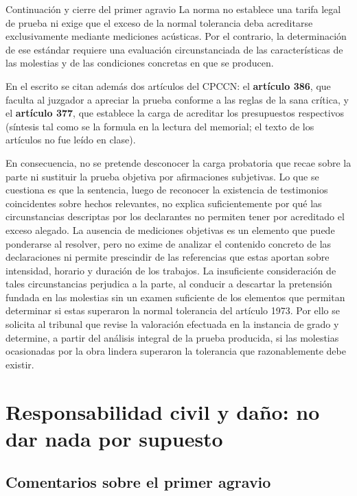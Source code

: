 \documentclass[12pt,oneside]{book}
\begin{document}
\begin{example}{Continuación y cierre del primer agravio}
La norma no establece una tarifa legal de prueba ni exige que el exceso de la normal tolerancia deba acreditarse exclusivamente mediante mediciones acústicas. Por el contrario, la determinación de ese estándar requiere una evaluación circunstanciada de las características de las molestias y de las condiciones concretas en que se producen.

En el escrito se citan además dos artículos del CPCCN: el \textbf{artículo 386}, que faculta al juzgador a apreciar la prueba conforme a las reglas de la sana crítica, y el \textbf{artículo 377}, que establece la carga de acreditar los presupuestos respectivos (síntesis tal como se la formula en la lectura del memorial; el texto de los artículos no fue leído en clase).

En consecuencia, no se pretende desconocer la carga probatoria que recae sobre la parte ni sustituir la prueba objetiva por afirmaciones subjetivas. Lo que se cuestiona es que la sentencia, luego de reconocer la existencia de testimonios coincidentes sobre hechos relevantes, no explica suficientemente por qué las circunstancias descriptas por los declarantes no permiten tener por acreditado el exceso alegado. La ausencia de mediciones objetivas es un elemento que puede ponderarse al resolver, pero no exime de analizar el contenido concreto de las declaraciones ni permite prescindir de las referencias que estas aportan sobre intensidad, horario y duración de los trabajos. La insuficiente consideración de tales circunstancias perjudica a la parte, al conducir a descartar la pretensión fundada en las molestias sin un examen suficiente de los elementos que permitan determinar si estas superaron la normal tolerancia del artículo 1973. Por ello se solicita al tribunal que revise la valoración efectuada en la instancia de grado y determine, a partir del análisis integral de la prueba producida, si las molestias ocasionadas por la obra lindera superaron la tolerancia que razonablemente debe existir.
\end{example}

\section{Responsabilidad civil y daño: no dar nada por supuesto}

\subsection{Comentarios sobre el primer agravio}
\end{document}
